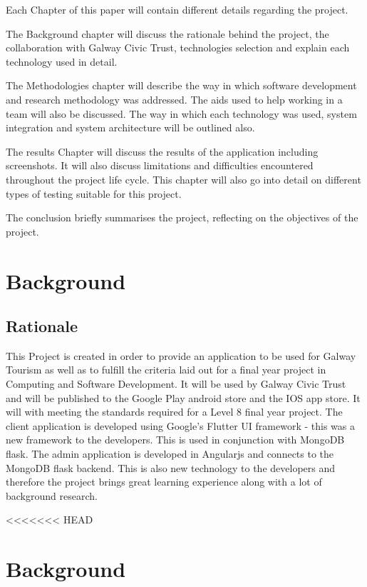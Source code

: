 Each Chapter of this paper will contain different details regarding the project. 

The Background chapter will discuss the rationale behind the project, the collaboration with Galway Civic Trust, technologies selection and explain each technology used in detail.

The Methodologies chapter will describe the way in which software development and research methodology was addressed. The aids used to help working in a team will also be discussed. The way in which each technology was used, system integration and system architecture will be outlined also.

The results Chapter will discuss the results of the application including screenshots. It will also discuss limitations and difficulties encountered throughout the project life cycle. This chapter will also go into detail on different types of testing suitable for this project.

The conclusion briefly summarises the project, reflecting on the objectives of the project.

\chapter{Background}
\section{Rationale}
This Project is created in order to provide an application to be used for Galway Tourism as well as to fulfill the criteria laid out for a final year project in Computing and Software Development. It will be used by Galway Civic Trust and will be published to the Google Play android store and the IOS app store. It will with meeting the standards required for a Level 8 final year project. The client application is developed using Google’s Flutter UI framework - this was a new framework to the developers. This is used in conjunction with MongoDB flask. The admin application is developed in Angularjs and connects to the MongoDB flask backend. This is also new technology to the developers and therefore the project brings great learning experience along with a lot of background research.

<<<<<<< HEAD
\chapter{Background}
